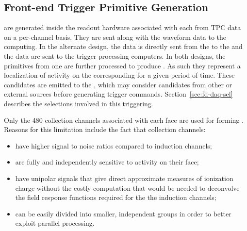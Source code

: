 
\subsection{Front-end Trigger Primitive Generation}
\label{sec:fd-daq-fetp}


 are generated inside the  readout
hardware associated with each  from TPC data on a per-channel basis.
They are sent along with the waveform data to the  
computing.
In the alternate design, the data is directly sent from the  to
the  and the data are sent to the trigger processing
computers.  
In both designs, the primitives from one  are further
processed to produce . 
As such they represent a localization of activity on the corresponding
  for a given period of time. 
These candidates are emitted to the , which may consider
candidates from other  or external sources before
generating trigger commands.
Section~\ref{sec:fd-daq-sel} describes the selections involved in this
triggering.

Only the \num{480} collection channels associated with each  face are
used for forming . 
Reasons for this limitation include the fact that collection
channels:

\begin{itemize}
\item have higher signal to noise ratios compared to induction channels;
\item are fully and independently sensitive to activity on their  face;
\item have unipolar signals that give direct approximate measures
  of ionization charge without the costly computation that would be needed to 
  deconvolve the field response functions required for the the induction channels;
\item can be easily divided into smaller, independent groups in order
  to better exploit parallel processing.
\end{itemize}


